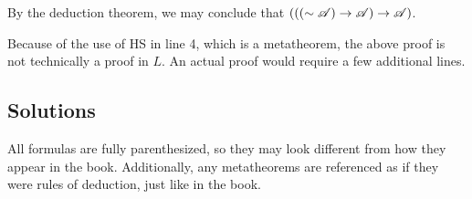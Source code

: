 \begin{proposition}
\begin{enumerate}[label=(\alph*)]
      By the deduction theorem, we may conclude that \((((\sim\mathscr{A}) \rightarrow \mathscr{A}) \rightarrow \mathscr{A})\).

      \note{} Because of the use of HS in line 4, which is a metatheorem, the above proof is not technically a proof in \(L\). An actual proof would require a few additional lines.
  \end{enumerate}
\end{proposition}

\subsection*{Solutions}

\note{} All formulas are fully parenthesized, so they may look different from how they appear in the book. Additionally, any metatheorems are referenced as if they were rules of deduction, just like in the book.
%
